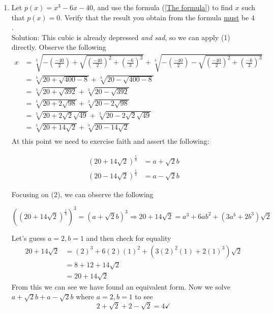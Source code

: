 \documentclass[10pt]{article}
\newcommand{\solution}{\color{blue} Solution: \color{black}}
\begin{document}
	\begin{enumerate}
		
		\item Let $p(x) = x^3 -6x - 40$, and use the formula (\ref{The formula}) to find $x$ such that $p(x) = 0$.
		Verify that the result you obtain from the formula \underline{must} be $4$.\\

        \solution This cubic is already depressed \textit{and sad}, so we can apply (1) directly. Observe the following 
        \begin{align*}
            x &= \sqrt[3]{- \left(\frac{-40}{2}\right) + \sqrt{\left(\frac{-40}{2}\right)^2 + \left(\frac{-6}{3}\right)^3}} + \sqrt[3]{- \left(\frac{-40}{2}\right) - \sqrt{\left(\frac{-40}{2}\right)^2 + \left(\frac{-6}{3}\right)^3}}\\
              &= \sqrt[3]{20 + \sqrt{400 - 8}} + \sqrt[3]{20 - \sqrt{400 - 8}}\\
              &= \sqrt[3]{20 + \sqrt{392}} + \sqrt[3]{20 - \sqrt{392}}\\
              &= \sqrt[3]{20 + 2\sqrt{98}} + \sqrt[3]{20 - 2\sqrt{98}}\\
              &= \sqrt[3]{20 + 2\sqrt{2}\sqrt{49}} + \sqrt[3]{20 - 2\sqrt{2}\sqrt{49}}\\
              &= \sqrt[3]{20 + 14\sqrt{2}} + \sqrt[3]{20 - 14\sqrt{2}}\\
        \end{align*}
        At this point we need to exercise faith and assert the following:

        \begin{align}
            \left(20 + 14\sqrt{2}\right)^{\frac{1}{3}} &= a + \sqrt{2}b\\
            \left(20 - 14\sqrt{2}\right)^{\frac{1}{3}} &= a - \sqrt{2}b
        \end{align}

        Focusing on (2), we can observe the following

        \[\left(\left(20 + 14\sqrt{2}\right)^{\frac{1}{3}}\right)^3 = \left(a + \sqrt{2}b\right)^3 \Rightarrow 20 + 14\sqrt{2} = a^3 + 6ab^2 + (3a^b + 2b^3)\sqrt{2}\]

        Let's guess $a = 2, b = 1$ and then check for equality
        \begin{align*}
            20 + 14 \sqrt{2} &= (2)^3 + 6(2)(1)^2 + (3(2)^2(1) + 2(1)^3)\sqrt{2}\\
                             &= 8 + 12 + 14 \sqrt{2}\\
                             &= 20 + 14\sqrt{2}
        \end{align*}
        From this we can see we have found an equivalent form. Now we solve $a + \sqrt{2}b + a - \sqrt{2}b$ where $a = 2, b = 1$ to see
        \[2 + \sqrt{2} + 2 - \sqrt{2} = 4 \checkmark\]
        

\end{enumerate}
\end{document}
